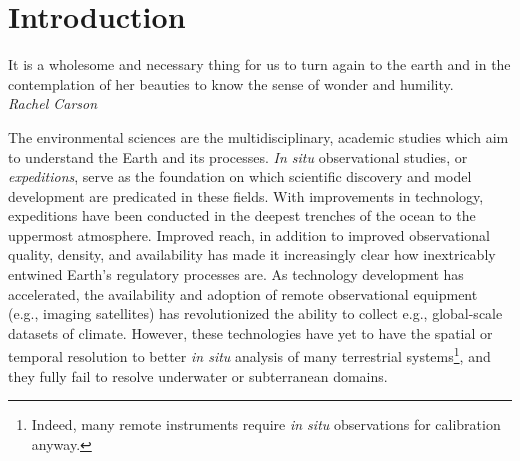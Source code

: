 \chapter{Introduction}
\label{chap:intro}

\begin{center}
    \begin{minipage}{0.5\textwidth}
      \begin{small}
       It is a wholesome and necessary thing for us to turn again to the earth and in the contemplation of her beauties to know the sense of wonder and humility.\\ \emph{Rachel Carson}
      \end{small}
    \end{minipage}
    \vspace{0.5cm}
\end{center}



The environmental sciences are the multidisciplinary, academic studies which aim to understand the Earth and its processes.
\emph{In situ} observational studies, or \emph{expeditions}, serve as the foundation on which scientific discovery and model development are predicated in these fields.
With improvements in technology, expeditions have been conducted in the deepest trenches of the ocean to the uppermost atmosphere.
Improved reach, in addition to improved observational quality, density, and availability has made it increasingly clear how inextricably entwined Earth's regulatory processes are.
As technology development has accelerated, the availability and adoption of remote observational equipment (e.g., imaging satellites) has revolutionized the ability to collect e.g., global-scale datasets of climate.
However, these technologies have yet to have the spatial or temporal resolution to better \emph{in situ} analysis of many terrestrial systems\footnote{Indeed, many remote instruments require \emph{in situ} observations for calibration anyway.}, and they fully fail to resolve underwater or subterranean domains. 

